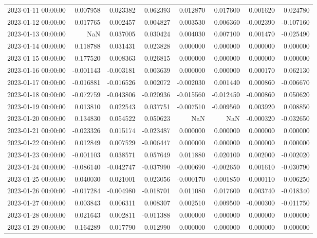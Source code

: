 \begin{tabular}{lrrrrrrr}
2023-01-11 00:00:00 & 0.007958 & 0.023382 & 0.062393 & 0.012870 & 0.017600 & 0.001620 & 0.024780 \\
2023-01-12 00:00:00 & 0.017765 & 0.002457 & 0.004827 & 0.003530 & 0.006360 & -0.002390 & -0.107160 \\
2023-01-13 00:00:00 & NaN & 0.037005 & 0.030424 & 0.004030 & 0.007100 & 0.001470 & -0.025490 \\
2023-01-14 00:00:00 & 0.118788 & 0.031431 & 0.023828 & 0.000000 & 0.000000 & 0.000000 & 0.000000 \\
2023-01-15 00:00:00 & 0.177520 & 0.008363 & -0.026815 & 0.000000 & 0.000000 & 0.000000 & 0.000000 \\
2023-01-16 00:00:00 & -0.001143 & -0.003181 & 0.003639 & 0.000000 & 0.000000 & 0.000170 & 0.062130 \\
2023-01-17 00:00:00 & -0.016881 & -0.016526 & 0.002072 & -0.002030 & 0.001440 & 0.000860 & -0.006670 \\
2023-01-18 00:00:00 & -0.072759 & -0.043806 & -0.020936 & -0.015560 & -0.012450 & -0.000860 & 0.050620 \\
2023-01-19 00:00:00 & 0.013810 & 0.022543 & 0.037751 & -0.007510 & -0.009560 & 0.003920 & 0.008850 \\
2023-01-20 00:00:00 & 0.134830 & 0.054522 & 0.050623 & NaN & NaN & -0.000320 & -0.032650 \\
2023-01-21 00:00:00 & -0.023326 & 0.015174 & -0.023487 & 0.000000 & 0.000000 & 0.000000 & 0.000000 \\
2023-01-22 00:00:00 & 0.012849 & 0.007529 & -0.006447 & 0.000000 & 0.000000 & 0.000000 & 0.000000 \\
2023-01-23 00:00:00 & -0.001103 & 0.038571 & 0.057649 & 0.011880 & 0.020100 & 0.002000 & -0.002020 \\
2023-01-24 00:00:00 & -0.086140 & -0.042747 & -0.037990 & -0.000690 & -0.002650 & 0.001610 & -0.030790 \\
2023-01-25 00:00:00 & 0.040030 & 0.021001 & 0.023056 & -0.000170 & -0.001850 & -0.000110 & -0.006250 \\
2023-01-26 00:00:00 & -0.017284 & -0.004980 & -0.018701 & 0.011080 & 0.017600 & 0.003740 & -0.018340 \\
2023-01-27 00:00:00 & 0.003843 & 0.006311 & 0.008307 & 0.002510 & 0.009500 & -0.000300 & -0.011750 \\
2023-01-28 00:00:00 & 0.021643 & 0.002811 & -0.011388 & 0.000000 & 0.000000 & 0.000000 & 0.000000 \\
2023-01-29 00:00:00 & 0.164289 & 0.017790 & 0.012990 & 0.000000 & 0.000000 & 0.000000 & 0.000000 \\

\end{tabular}
